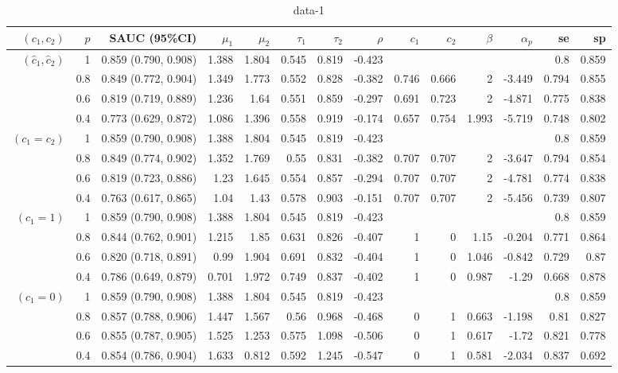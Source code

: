 \begin{table}

\caption{data-1}
\centering
\begin{tabular}[t]{rrrrrrrrrrrrrr}
\toprule
$(c_1, c_2)$ & $p$ & SAUC (95\%CI) & $\mu_1$ & $\mu_2$ & $\tau_1$ & $\tau_2$ & $\rho$ & $c_1$ & $c_2$ & $\beta$ & $\alpha_p$ & se & sp\\
\midrule
$(\hat{c}_1, \hat{c}_2)$ & 1 & 0.859 (0.790, 0.908) & 1.388 & 1.804 & 0.545 & 0.819 & -0.423 &  &  &  &  & 0.8 & 0.859\\
 & 0.8 & 0.849 (0.772, 0.904) & 1.349 & 1.773 & 0.552 & 0.828 & -0.382 & 0.746 & 0.666 & 2 & -3.449 & 0.794 & 0.855\\
 & 0.6 & 0.819 (0.719, 0.889) & 1.236 & 1.64 & 0.551 & 0.859 & -0.297 & 0.691 & 0.723 & 2 & -4.871 & 0.775 & 0.838\\
 & 0.4 & 0.773 (0.629, 0.872) & 1.086 & 1.396 & 0.558 & 0.919 & -0.174 & 0.657 & 0.754 & 1.993 & -5.719 & 0.748 & 0.802\\
\addlinespace
$(c_1 = c_2)$ & 1 & 0.859 (0.790, 0.908) & 1.388 & 1.804 & 0.545 & 0.819 & -0.423 &  &  &  &  & 0.8 & 0.859\\
 & 0.8 & 0.849 (0.774, 0.902) & 1.352 & 1.769 & 0.55 & 0.831 & -0.382 & 0.707 & 0.707 & 2 & -3.647 & 0.794 & 0.854\\
 & 0.6 & 0.819 (0.723, 0.886) & 1.23 & 1.645 & 0.554 & 0.857 & -0.294 & 0.707 & 0.707 & 2 & -4.781 & 0.774 & 0.838\\
 & 0.4 & 0.763 (0.617, 0.865) & 1.04 & 1.43 & 0.578 & 0.903 & -0.151 & 0.707 & 0.707 & 2 & -5.456 & 0.739 & 0.807\\
\addlinespace
$(c_1 = 1)$ & 1 & 0.859 (0.790, 0.908) & 1.388 & 1.804 & 0.545 & 0.819 & -0.423 &  &  &  &  & 0.8 & 0.859\\
 & 0.8 & 0.844 (0.762, 0.901) & 1.215 & 1.85 & 0.631 & 0.826 & -0.407 & 1 & 0 & 1.15 & -0.204 & 0.771 & 0.864\\
 & 0.6 & 0.820 (0.718, 0.891) & 0.99 & 1.904 & 0.691 & 0.832 & -0.404 & 1 & 0 & 1.046 & -0.842 & 0.729 & 0.87\\
 & 0.4 & 0.786 (0.649, 0.879) & 0.701 & 1.972 & 0.749 & 0.837 & -0.402 & 1 & 0 & 0.987 & -1.29 & 0.668 & 0.878\\
\addlinespace
$(c_1 = 0)$ & 1 & 0.859 (0.790, 0.908) & 1.388 & 1.804 & 0.545 & 0.819 & -0.423 &  &  &  &  & 0.8 & 0.859\\
 & 0.8 & 0.857 (0.788, 0.906) & 1.447 & 1.567 & 0.56 & 0.968 & -0.468 & 0 & 1 & 0.663 & -1.198 & 0.81 & 0.827\\
 & 0.6 & 0.855 (0.787, 0.905) & 1.525 & 1.253 & 0.575 & 1.098 & -0.506 & 0 & 1 & 0.617 & -1.72 & 0.821 & 0.778\\
 & 0.4 & 0.854 (0.786, 0.904) & 1.633 & 0.812 & 0.592 & 1.245 & -0.547 & 0 & 1 & 0.581 & -2.034 & 0.837 & 0.692\\
\bottomrule
\end{tabular}
\end{table}
